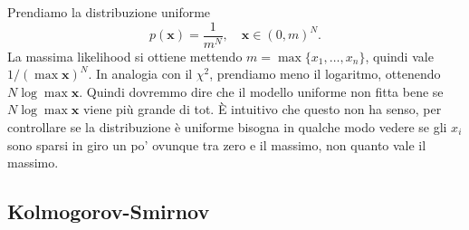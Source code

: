 \begin{example}
	Prendiamo la distribuzione uniforme
	\begin{equation*}
		p(\mathbf x) = \frac1{m^N},
		\quad \mathbf x \in (0,m)^N.
	\end{equation*}
	La massima likelihood si ottiene mettendo $m = \max\{x_1,\ldots,x_n\}$,
    quindi vale $1/(\max\mathbf x)^N$. In analogia con il $\chi^2$, prendiamo
    meno il logaritmo, ottenendo $N \log\max\mathbf x$. Quindi dovremmo
    dire che il modello uniforme non fitta bene se $N \log\max\mathbf x$ viene
    più grande di tot. È intuitivo che questo non ha senso, per controllare
    se la distribuzione è uniforme bisogna in qualche modo vedere se gli $x_i$
    sono sparsi in giro un po' ovunque tra zero e il massimo, non quanto vale
    il massimo.
\end{example}

\subsection{Kolmogorov-Smirnov}

